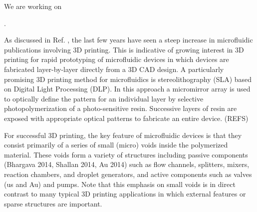\documentclass{article} %
\begin{document}
We are working on
 .

As discussed in Ref. , the last few years have seen a steep increase in microfluidic publications involving 3D printing. This is indicative of growing interest in 3D printing for rapid prototyping of microfluidic devices in which devices are fabricated layer-by-layer directly from a 3D CAD design. A particularly promising 3D printing method for microfluidics is stereolithography (SLA) based on Digital Light Processing (DLP). In this approach a micromirror array is used to optically define the pattern for an individual layer by selective photopolymerization of a photo-sensitive resin. Successive layers of resin are exposed with appropriate optical patterns to fabricate an entire device. (REFS)

For successful 3D printing, the key feature of microfluidic devices is that they consist primarily of a series of small (micro) voids inside the polymerized material. These voids form a variety of structures including passive components\cite{Bhargava2014,Shallan2014,Au2014} (Bhargava 2014, Shallan 2014, Au 2014) such as flow channels, splitters, mixers, reaction chambers, and droplet generators, and active components such as valves (us and Au) and pumps.\cite{Au2015} Note that this emphasis on small voids is in direct contrast to many typical 3D printing applications in which external features or sparse structures are important. 

\end{document}
